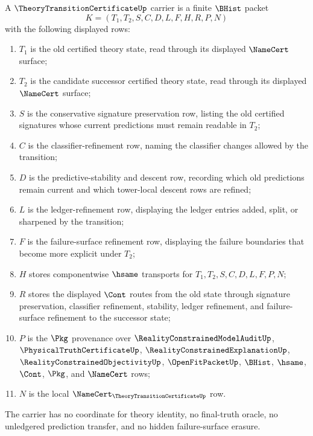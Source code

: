 \begin{definition}
\label{def:theory-transition-certificate-carrier}
A $\TheoryTransitionCertificateUp$ carrier is a finite $\BHist$ packet
$$
K=(T_1,T_2,S,C,D,L,F,H,R,P,N)
$$
with the following displayed rows:
\begin{enumerate}
\item $T_1$ is the old certified theory state, read through its displayed $\NameCert$ surface;
\item $T_2$ is the candidate successor certified theory state, read through its displayed $\NameCert$ surface;
\item $S$ is the conservative signature preservation row, listing the old certified signatures whose current predictions must remain readable in $T_2$;
\item $C$ is the classifier-refinement row, naming the classifier changes allowed by the transition;
\item $D$ is the predictive-stability and descent row, recording which old predictions remain current and which tower-local descent rows are refined;
\item $L$ is the ledger-refinement row, displaying the ledger entries added, split, or sharpened by the transition;
\item $F$ is the failure-surface refinement row, displaying the failure boundaries that become more explicit under $T_2$;
\item $H$ stores componentwise $\hsame$ transports for $T_1,T_2,S,C,D,L,F,P,N$;
\item $R$ stores the displayed $\Cont$ routes from the old state through signature preservation, classifier refinement, stability, ledger refinement, and failure-surface refinement to the successor state;
\item $P$ is the $\Pkg$ provenance over $\RealityConstrainedModelAuditUp$, $\PhysicalTruthCertificateUp$, $\RealityConstrainedExplanationUp$, $\RealityConstrainedObjectivityUp$, $\OpenFitPacketUp$, $\BHist$, $\hsame$, $\Cont$, $\Pkg$, and $\NameCert$ rows;
\item $N$ is the local $\NameCert_{\TheoryTransitionCertificateUp}$ row.
\end{enumerate}
The carrier has no coordinate for theory identity, no final-truth oracle, no unledgered prediction transfer, and no hidden failure-surface erasure.
\end{definition}

